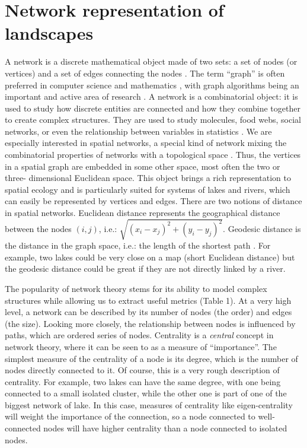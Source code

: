 \documentclass[12pt]{article}
\begin{document}
\section{Network representation of landscapes}

A network is a discrete mathematical object made of two sets: a set of nodes
(or vertices) and a set of edges connecting the nodes \cite{new10}. The
term ``graph'' is often preferred in computer science and mathematics
\cite{gro06}, with graph algorithms being an important and active area of
research \cite{sed01}. A network is a combinatorial object: it is used to study
how discrete entities are connected and how they combine together to create
complex structures. They are used to study molecules, food webs, social
networks, or even the relationship between variables in statistics
\cite{wri21,new10}. We are especially interested in spatial networks, a special
kind of network mixing the combinatorial properties of networks with a
topological space \cite{kob94}. Thus, the vertices in a spatial graph are
embedded in some other space, most often the two or three- dimensional Euclidean
space. This object brings a rich representation to spatial ecology and is
particularly suited for systems of lakes and rivers, which can easily be
represented by vertices and edges. There are two notions of distance in spatial
networks. Euclidean distance represents the geographical distance between the
nodes $(i, j)$, i.e.: $\sqrt{(x_i - x_j)^2 + (y_i - y_ j)^2}$. Geodesic
distance is the distance in the graph space, i.e.: the length of the shortest
path \cite{dij59}. For example, two lakes could be very close on a map (short
Euclidean distance) but the geodesic distance could be great if they are not
directly linked by a river.

The popularity of network theory stems for its ability to model complex
structures while allowing us to extract useful metrics (Table 1). At a very high
level, a network can be described by its number of nodes (the order) and 
edges (the size). Looking more closely, the relationship between
nodes is influenced by paths, which are ordered series of nodes. Centrality
is a \emph{central} concept in network theory, where it can be seen
to as a measure of ``importance''. The simplest measure of the centrality of a
node is its degree, which is the number of nodes directly connected to it. Of
course, this is a very rough description of centrality. For example, two lakes
can have the same degree, with one being connected to a small isolated cluster,
while the other one is part of one of the biggest network of lake. In this case,
measures of centrality like eigen-centrality will weight the importance of the
connection, so a node connected to well-connected nodes will have higher
centrality than a node connected to isolated nodes.
\end{document}
